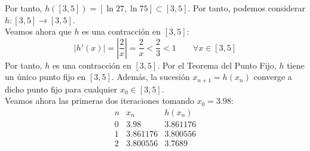 \begin{ejercicio}
\begin{enumerate}
        Por tanto, $h\left([3,5]\right)=\left[\ln 27, \ln 75\right]\subset [3,5]$. Por tanto, podemos considerar $h: [3,5]\to [3,5]$.\\
        Veamos ahora que $h$ es una contracción en $[3,5]$:
        \begin{equation*}
            |h'(x)|=\left|\dfrac{2}{x}\right|=\dfrac{2}{x}<\frac{2}{3}<1\qquad \forall x\in [3,5]
        \end{equation*}
        Por tanto, $h$ es una contracción en $[3,5]$. Por el Teorema del Punto Fijo, $h$ tiene un único punto fijo en $[3,5]$. Además, la sucesión $x_{n+1}=h(x_n)$ converge a dicho punto fijo para cualquier $x_0\in [3,5]$.\\
        Veamos ahora las primeras dos iteraciones tomando $x_0=3.98$:
        \begin{equation*}
            \begin{array}{c|c|c}
                n & x_n & h(x_n)\\ \hline
                0 & 3.98 & 3.861176\\
                1 & 3.861176 & 3.800556\\
                2 & 3.800556 & 3.7689
            \end{array}
        \end{equation*}
    \end{enumerate}
\end{ejercicio}

